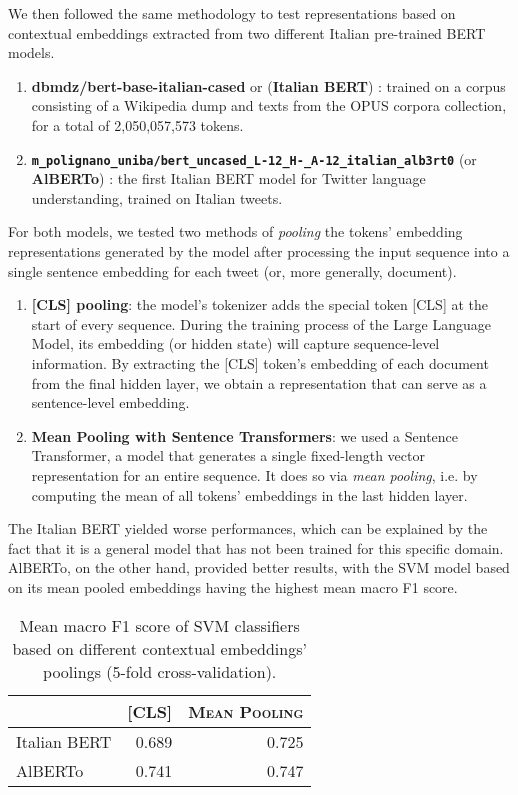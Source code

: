 We then followed the same methodology to test representations based on contextual embeddings extracted from two different Italian pre-trained BERT models.
\begin{enumerate}
    \item \textbf{dbmdz/bert-base-italian-cased} or (\textbf{Italian BERT}) \cite{italian_bert}:  trained on a corpus consisting of a Wikipedia dump and texts from the OPUS corpora collection, for a total of 2,050,057,573 tokens.
    \item \texttt{\textbf{m\_polignano\_uniba/bert\_uncased\_L{-}12\_H{-}\_A{-}12\_italian\_alb3rt0}} (or \textbf{AlBERTo}) \cite{alberto}:  the first Italian BERT model for Twitter language understanding, trained on Italian tweets.
\end{enumerate}

For both models, we tested two methods of \textit{pooling} the tokens' embedding representations generated by the model after processing the input sequence into a single sentence embedding for each tweet (or, more generally, document).
\begin{enumerate}
    \item \textbf{[CLS] pooling}: the model's tokenizer adds the special token [CLS] at the start of every sequence. During the training process of the Large Language Model, its embedding (or hidden state) will capture sequence-level information. By extracting the [CLS] token's embedding of each document from the final hidden layer, we obtain a representation that can serve as a sentence-level embedding.
    \item \textbf{Mean Pooling with Sentence Transformers}: we used a Sentence Transformer, a model that generates a single fixed-length vector representation for an entire sequence. It does so via \textit{mean pooling}, i.e. by computing the mean of all tokens' embeddings in the last hidden layer.
\end{enumerate}

The Italian BERT yielded worse performances, which can be explained by the fact that it is a general model that has not been trained for this specific domain. AlBERTo, on the other hand, provided better results, with the SVM model based on its mean pooled embeddings having the highest mean macro F1 score.
    
\begin{table}
\centering
    \begin{tabular}{lrr}
        \toprule
        & \textsc{[CLS]} & \textsc{Mean Pooling} \\
        \midrule
        Italian BERT & 0.689 & 0.725 \\
        AlBERTo & 0.741 & 0.747 \\
        \bottomrule
    \end{tabular}
    \caption{Mean macro F1 score of SVM classifiers based on different contextual embeddings' poolings (5-fold cross-validation).}
    \label{tbl:svm_f1_contextual_embs_pooling}
\end{table}
